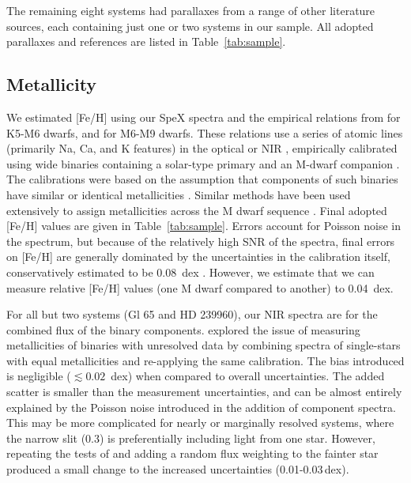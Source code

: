 \documentclass[twocolumn]{aastex62}
\begin{document}
The remaining eight systems had parallaxes from a range of other literature sources, each containing just one or two systems in our sample. All adopted parallaxes and references are listed in Table~\ref{tab:sample}.

\subsection{Metallicity}\label{sec:feh}

We estimated [Fe/H] using our SpeX spectra and the empirical relations from \citet{Mann2013a} for K5-M6 dwarfs, and \citet{Mann2014} for M6-M9 dwarfs. These relations use a series of atomic lines (primarily Na, Ca, and K features) in the optical or NIR \citep[e.g.,][]{2010ApJ...720L.113R,Terrien:2012lr}, empirically calibrated using wide binaries containing a solar-type primary and an M-dwarf companion \citep[e.g.,][]{2005A&A...442..635B,Johnson2009,Neves2012}. The calibrations were based on the assumption that components of such binaries have similar or identical metallicities \citep[e.g.,][]{2015ApJ...801L..10T}. Similar methods have been used extensively to assign metallicities across the M dwarf sequence \citep[e.g.,][]{Terrien2015,Muirhead2015,Dressing2017,2018ApJ...853...30V,2018ApJ...854..145M}. Final adopted [Fe/H] values are given in Table~\ref{tab:sample}. Errors account for Poisson noise in the spectrum, but because of the relatively high SNR of the spectra, final errors on [Fe/H] are generally dominated by the uncertainties in the calibration itself, conservatively estimated to be 0.08~dex \citep{Mann2013a,Mann2014}. However, we estimate that we can measure relative [Fe/H] values (one M dwarf compared to another) to 0.04~dex. 

For all but two systems (Gl 65 and HD 239960), our NIR spectra are for the combined flux of the binary components. \citet{Mann2014} explored the issue of measuring metallicities of binaries with unresolved data by combining spectra of single-stars with equal metallicities and re-applying the same calibration. The bias introduced is negligible ($\lesssim0.02$~dex) when compared to overall uncertainties. The added scatter is smaller than the measurement uncertainties, and can be almost entirely explained by the Poisson noise introduced in the addition of component spectra. This may be more complicated for nearly or marginally resolved systems, where the narrow slit (0.3\arcsec) is preferentially including light from one star. However, repeating the tests of \citet{Mann2014} and adding a random flux weighting to the fainter star produced a small change to the increased uncertainties (0.01-0.03\,dex).
\end{document}
